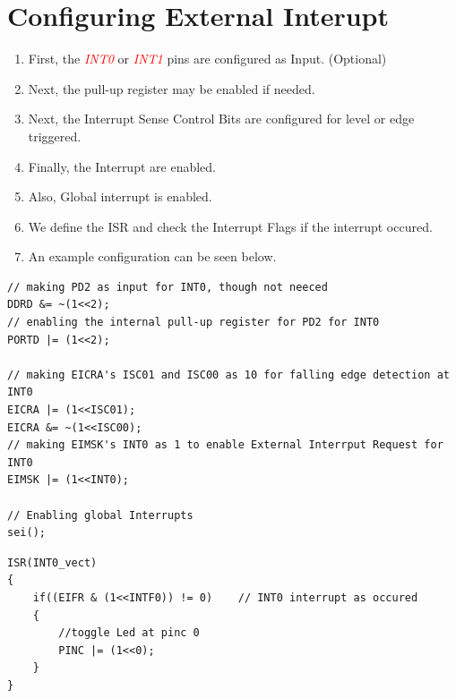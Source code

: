 \documentclass{article}
\newcommand{\pinFormat}[1]{\emph{\textcolor{red}{#1}}}
\begin{document}
\section{Configuring External Interupt}
\begin{enumerate}[label=(\Roman*)]
    \item First, the \pinFormat{INT0} or \pinFormat{INT1} pins are configured as Input. (Optional)
    \item Next, the pull-up register may be enabled if needed.
    \item Next, the Interrupt Sense Control Bits are configured for level or edge triggered.
    \item Finally, the Interrupt are enabled.
    \item Also, Global interrupt is enabled.
    \item We define the ISR and check the Interrupt Flags if the interrupt occured.
    \item An example configuration can be seen below.
\end{enumerate}

\begin{minipage}{0.5\textwidth}
\begin{verbatim}
// making PD2 as input for INT0, though not neeced
DDRD &= ~(1<<2);
// enabling the internal pull-up register for PD2 for INT0
PORTD |= (1<<2);

// making EICRA's ISC01 and ISC00 as 10 for falling edge detection at INT0
EICRA |= (1<<ISC01);
EICRA &= ~(1<<ISC00);
// making EIMSK's INT0 as 1 to enable External Interrput Request for INT0
EIMSK |= (1<<INT0);

// Enabling global Interrupts
sei();	
\end{verbatim}
\end{minipage}
\begin{minipage}{0.45\textwidth}
\begin{verbatim}
ISR(INT0_vect)
{
    if((EIFR & (1<<INTF0)) != 0)	// INT0 interrupt as occured
    {		
        //toggle Led at pinc 0
        PINC |= (1<<0);
    }
}
\end{verbatim}
\end{minipage}
\end{document}

